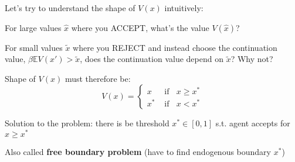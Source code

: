\documentclass[11pt, aspectratio=169]{beamer}
\newenvironment{witemize}{\itemize\addtolength{\itemsep}{10pt}}{\enditemize}
\begin{document}
\begin{frame}{}

Let's try to understand the shape of $V(x)$ intuitively:
\vspace{2mm}
\begin{witemize}
\item For large values $\hat x$ where you ACCEPT, what's the value $V(\hat x)$?
\item For small values $\tilde x$ where you REJECT and instead choose the continuation value, $\beta \mathbb E V(x') > \tilde x$, does the continuation value depend on $\tilde x$? Why not?
\end{witemize}

\pause
\vspace{5mm}
Shape of $V(x)$ must therefore be:
\begin{equation*}
	V(x) = 
	\begin{cases} 
		x & \text{ if } \;\; x \geq x^* \\
		x^* & \text{ if } \;\; x < x^* 
	\end{cases}
\end{equation*}
\begin{witemize}
\item Solution to the problem: there is be threshold $x^* \in [0, 1]$ s.t. agent accepts for $x \geq x^*$

\item Also called \textbf{free boundary problem} (have to find endogenous boundary $x^*$)

\end{witemize}
\end{frame}
\end{document}
